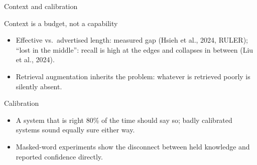 \documentclass[11pt]{beamer}
\begin{document}
\begin{frame}{Context and calibration}
  \begin{block}{Context is a budget, not a capability}
    \begin{itemize}
      \item Effective vs.\ advertised length: measured gap (Hsieh et al.,
            2024, RULER); ``lost in the middle'': recall is high at the
            edges and collapses in between (Liu et al., 2024).
      \item Retrieval augmentation inherits the problem: whatever is
            retrieved poorly is silently absent.
    \end{itemize}
  \end{block}
  \begin{block}{Calibration}
    \begin{itemize}
      \item A system that is right 80\% of the time should say so;
            badly calibrated systems sound equally sure either way.
      \item Masked-word experiments show the disconnect between held
            knowledge and reported confidence directly.
    \end{itemize}
  \end{block}
\end{frame}
\end{document}
